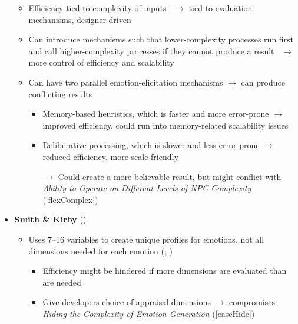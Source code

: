 \begin{itemize}
\begin{itemize}
        \item Efficiency tied to complexity of inputs~\citep[p.~182--188]{occ}
        $\rightarrow$ tied to evaluation mechanisms, designer-driven

        \item Can introduce mechanisms such that lower-complexity processes run
        first and call higher-complexity processes if they cannot produce a
        result~\citep[p.~179]{ortony2005affect} $\rightarrow$ more control of
        efficiency and scalability

        \item Can have two parallel emotion-elicitation mechanisms
        $\rightarrow$ can produce conflicting results~\citep[p.~37--39,
        54]{clore2000cognition}
        \begin{itemize}
            \item Memory-based heuristics, which is faster and more error-prone
            $\rightarrow$ improved efficiency, could run into memory-related
            scalability issues

            \item Deliberative processing, which is slower and less error-prone
            $\rightarrow$ reduced efficiency, more scale-friendly

            \item [$\rightarrow$] Could create a more believable result, but
            might conflict with \textit{Ability to Operate on Different Levels
                of NPC Complexity} (\ref{flexComplex})
        \end{itemize}
    \end{itemize}

    \item \textbf{Smith \& Kirby} (\strong)
    \begin{itemize}
        \item Uses 7--16 variables to create unique profiles for emotions, not
        all dimensions needed for each emotion (;
        )
        \begin{itemize}
            \item Efficiency might be hindered if more dimensions are evaluated
            than are needed

            \item Give developers choice of appraisal dimensions $\rightarrow$
            compromises \textit{Hiding the Complexity of Emotion Generation}
            (\ref{easeHide})
        \end{itemize}


\end{itemize}
\end{itemize}

